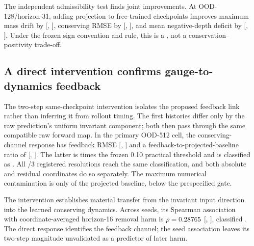 \documentclass{article}
\begin{document}
The independent admissibility test finds joint improvements. At OOD-128/horizon-31, adding
projection to free-trained checkpoints improves maximum mass drift by \SWETradeoffConservation{}
[\SWETradeoffConservationLow, \SWETradeoffConservationHigh], conserving RMSE by
\SWETradeoffDynamics{} [\SWETradeoffDynamicsLow, \SWETradeoffDynamicsHigh], and mean negative-depth
deficit by \SWETradeoffPositivity{} [\SWETradeoffPositivityLow,
\SWETradeoffPositivityHigh]. Under the frozen sign convention and rule, this is a
\emph{\SWETradeoffClassification}, not a conservation--positivity trade-off.

\subsection{A direct intervention confirms gauge-to-dynamics feedback}

The two-step same-checkpoint intervention isolates the proposed feedback link rather than inferring
it from rollout timing. The first histories differ only by the raw prediction's uniform invariant
component; both then pass through the same compatible raw forward map. In the primary OOD-512
cell, the conserving-channel response has feedback RMSE \GaugeFeedbackRMSE{}
[\GaugeFeedbackRMSELow, \GaugeFeedbackRMSEHigh] and a feedback-to-projected-baseline ratio of
\GaugeRatio{} [\GaugeRatioLow, \GaugeRatioHigh]. The latter is \GaugeRatioOverThreshold{} times
the frozen 0.10 practical threshold and is classified as \emph{\GaugeClassification}.
All \GaugeMaterialCases/3 registered resolutions reach the same classification, and both absolute
and residual coordinates do so separately. The maximum numerical contamination is only
\GaugeMaxContamination{} of the projected baseline, below the prespecified
\GaugeContaminationLimit{} gate.

The intervention establishes material transfer from the invariant input direction into the
learned conserving dynamics. Across seeds, its Spearman association with coordinate-averaged
horizon-16 removal harm is $\rho=0.28765$
[\GaugeAssociationRhoLow, \GaugeAssociationRhoHigh], classified
\emph{\GaugeAssociationClassification}. The direct response identifies the feedback channel;
the seed association leaves its two-step magnitude unvalidated as a predictor of later harm.
\end{document}
